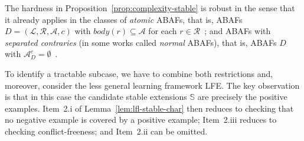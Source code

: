 \documentclass[letterpaper]{article} %
\newcommand{\stb}{\textit{st}}
\newcommand{\rules}{\ensuremath{\mathcal{R}}}
\newcommand{\asm}{\ensuremath{\mathcal{A}}}
\newcommand{\atoms}{\mathcal{L}}
\newcommand{\ruleset}{\mathcal{R}}
\newcommand{\assumptions}{\mathcal{A}}
\newcommand{\contra}{c}
\newcommand{\ABAdef}{D=(\atoms,\ruleset,\assumptions,\contra)}
\newcommand{\setS}{\mathbb{S}}
\newcommand{\contraryArgs}[1]{\asm^{c}_{#1}}
\newcommand{\ExLFE}[2]{\textsc{Ex-LFE}_{#1}^{#2}}
\begin{document}
The hardness in Proposition~\ref{prop:complexity-stable} is robust in the sense that it already applies in the 
classes of \emph{atomic} ABAFs, that is, ABAFs $\ABAdef$ with $body(r)\subseteq\asm$ for each $r\in\rules$~\cite{RapbergerU23}; and ABAFs with \emph{separated contraries} (in some works called \emph{normal} ABAFs), that is, ABAFs $D$ with $\contraryArgs{D}=\emptyset$~\cite{RapbergerU23,BondarenkoDKT97,SaA21}.



To identify a tractable subcase, we have to combine both restrictions and, moreover, consider the less general learning framework LFE. 
%
The key observation is that in this case the candidate stable extensions $\setS$ are precisely the positive examples. Item~2.i of Lemma~\ref{lem:lfl-stable-char} then reduces to checking that no negative example is covered by a positive example; Item~2.iii reduces to checking conflict-freeness; and Item~2.ii can be omitted.

\end{document}
